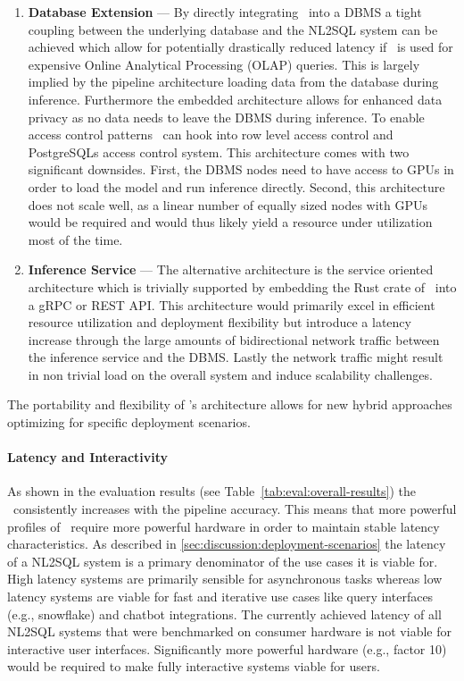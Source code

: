 \begin{enumerate}
    \item \textbf{Database Extension} — By directly integrating \Natural~into a
        DBMS a tight coupling between the underlying database and the NL2SQL
        system can be achieved which allow for potentially drastically reduced
        latency if \Natural~is used for expensive Online Analytical Processing
        (OLAP) queries. This is largely implied by the pipeline architecture
        loading data from the database during inference. Furthermore the
        embedded architecture allows for enhanced data privacy as no data needs
        to leave the DBMS during inference. To enable access control patterns
        \Natural~can hook into row level access control and PostgreSQLs access
        control system. This architecture comes with two significant downsides.
        First, the DBMS nodes need to have access to GPUs in order to load the
        model and run inference directly. Second, this architecture does not
        scale well, as a linear number of equally sized nodes with GPUs would
        be required and would thus likely yield a resource under utilization
        most of the time.
    \item \textbf{Inference Service} — The alternative architecture is the
        service oriented architecture which is trivially supported by embedding
        the Rust crate of \Natural~into a gRPC or REST API. This architecture
        would primarily excel in efficient resource utilization and deployment
        flexibility but introduce a latency increase through the large amounts
        of bidirectional network traffic between the inference service and the
        DBMS. Lastly the network traffic might result in non trivial load on
        the overall system and induce scalability challenges.
\end{enumerate}

The portability and flexibility of \Natural's architecture allows
for new hybrid approaches optimizing for specific deployment
scenarios.

\paragraph{Latency and Interactivity}

As shown in the evaluation results (see Table~\ref{tab:eval:overall-results})
the \CL~consistently increases with the pipeline accuracy. This means that more
powerful profiles of \Natural~require more powerful hardware in order to
maintain stable latency characteristics. As described in
\ref{sec:discussion:deployment-scenarios} the latency of a NL2SQL system is a
primary denominator of the use cases it is viable for. High latency systems
are primarily sensible for asynchronous tasks whereas low latency systems are
viable for fast and iterative use cases like query interfaces (e.g., snowflake)
and chatbot integrations. The currently achieved latency of all NL2SQL
systems that were benchmarked on consumer hardware is not viable for interactive
user interfaces. Significantly more powerful hardware (e.g., factor 10)
would be required to make fully interactive systems viable for users.

